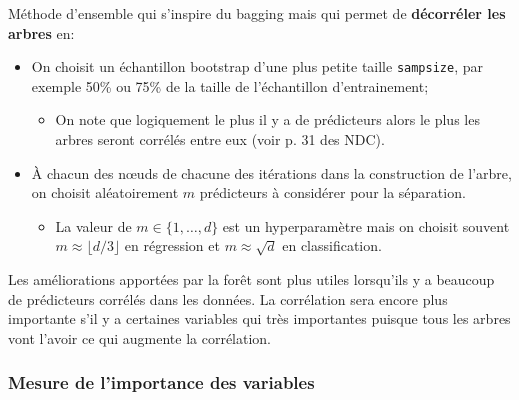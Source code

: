 \documentclass[10pt, french]{article}
\begin{document}
\begin{multicols*}{3}
\begin{definitionNOHFILLsub}
Méthode d'ensemble qui s'inspire du bagging mais qui permet de \textbf{décorréler les arbres} en:
\begin{itemize}[leftmargin = *]
	\item	On choisit un échantillon bootstrap d'une plus petite taille \texttt{sampsize}, par exemple 	50\% ou 75\% de la taille de l'échantillon d'entrainement;
		\begin{itemize}[leftmargin = *]
		\item	On note que logiquement le plus il y a de prédicteurs alors le plus les arbres seront corrélés entre eux (voir p. 31 des NDC).
		\end{itemize}
	\item	À chacun des nœuds de chacune des itérations dans la construction de l'arbre, on choisit aléatoirement $m$ prédicteurs à considérer pour la séparation.
		\begin{itemize}[leftmargin = *]
		\item	La valeur de $m \in \{1, \dots, d\}$ est un hyperparamètre mais on choisit souvent $m \approx \lfloor d / 3\rfloor$ en régression et $m \approx \sqrt{d}$ en classification.
		\end{itemize}
\end{itemize}

Les améliorations apportées par la forêt sont plus utiles lorsqu'ils y a beaucoup de prédicteurs corrélés dans les données. La corrélation sera encore plus importante s'il y a certaines variables qui très importantes puisque tous les arbres vont l'avoir ce qui augmente la corrélation.

\end{definitionNOHFILLsub}

\subsubsection*{Mesure de l'importance des variables}


\end{multicols*}
\end{document}
